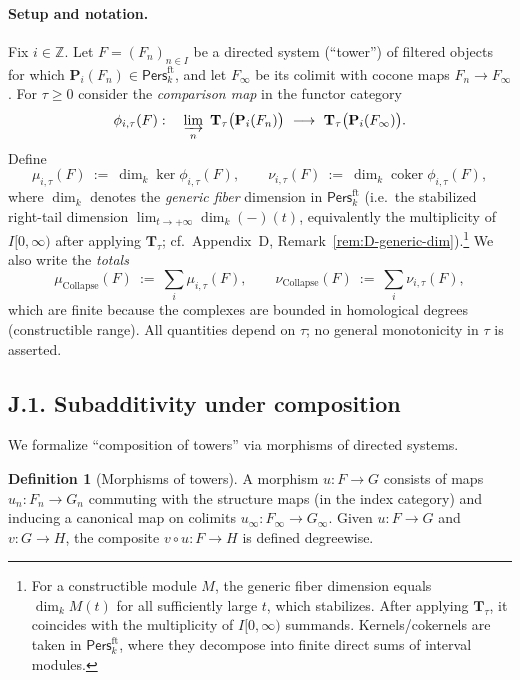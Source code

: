\documentclass[11pt]{article}
\numberwithin{equation}{section}
\theoremstyle{plain}
\theoremstyle{definition}
\theoremstyle{remark}
\newcommand{\Pers}{\mathsf{Pers}}
\theoremstyle{plain}
\theoremstyle{definition}
\numberwithin{equation}{section}
\theoremstyle{definition}
\newtheorem{definition}[theorem]{Definition}
\DeclareRobustCommand{\muc}{\mu_{\mathrm{Collapse}}}
\DeclareRobustCommand{\nuc}{\nu_{\mathrm{Collapse}}}
\numberwithin{equation}{section}
\theoremstyle{plain}
\theoremstyle{definition}
\theoremstyle{remark}
\providecommand{\muc}{\mu_{\mathrm{Collapse}}}
\providecommand{\nuc}{\nu_{\mathrm{Collapse}}}
\begin{document}
\paragraph{Setup and notation.}
Fix \(i\in\mathbb{Z}\).
Let \(F=(F_n)_{n\in I}\) be a directed system (``tower'') of filtered objects for which \(\mathbf{P}_i(F_n)\in\Pers^{\mathrm{ft}}_k\), and let \(F_\infty\) be its colimit with cocone maps \(F_n\to F_\infty\).
For \(\tau\ge 0\) consider the \emph{comparison map} in the functor category
\begin{equation}\label{J:eq:phi}
\phi_{i,\tau}(F):\quad
\varinjlim_{n}\ \mathbf{T}_\tau\big(\mathbf{P}_i(F_n)\big)\ \longrightarrow\ \mathbf{T}_\tau\big(\mathbf{P}_i(F_\infty)\big).
\end{equation}
Define
\begin{equation}\label{J:eq:mu-nu}
\mu_{i,\tau}(F)\ :=\ \dim_k \ker \phi_{i,\tau}(F),\qquad
\nu_{i,\tau}(F)\ :=\ \dim_k \operatorname{coker} \phi_{i,\tau}(F),
\end{equation}
where \(\dim_k\) denotes the \emph{generic fiber} dimension in \(\Pers^{\mathrm{ft}}_k\) (i.e.\ the stabilized right-tail dimension \(\lim_{t\to+\infty}\dim_k(-)(t)\), equivalently the multiplicity of \(I[0,\infty)\) after applying \(\mathbf{T}_\tau\); cf.\ Appendix~D, Remark~\ref{rem:D-generic-dim}).\footnote{For a constructible module \(M\), the generic fiber dimension equals \(\dim_k M(t)\) for all sufficiently large \(t\), which stabilizes. After applying \(\mathbf{T}_\tau\), it coincides with the multiplicity of \(I[0,\infty)\) summands. Kernels/cokernels are taken in \(\Pers^{\mathrm{ft}}_k\), where they decompose into finite direct sums of interval modules.}
We also write the \emph{totals}
\begin{equation}\label{J:eq:totals}
\muc(F)\ :=\ \sum_{i}\mu_{i,\tau}(F),\qquad
\nuc(F)\ :=\ \sum_{i}\nu_{i,\tau}(F),
\end{equation}
which are finite because the complexes are bounded in homological degrees (constructible range).
All quantities depend on \(\tau\); no general monotonicity in \(\tau\) is asserted.

\subsection*{J.1. Subadditivity under composition}
We formalize ``composition of towers'' via morphisms of directed systems.

\begin{definition}[Morphisms of towers]
A morphism \(u:F\to G\) consists of maps \(u_n:F_n\to G_n\) commuting with the structure maps (in the index category) and inducing a canonical map on colimits \(u_\infty:F_\infty\to G_\infty\).
Given \(u:F\to G\) and \(v:G\to H\), the composite \(v\circ u:F\to H\) is defined degreewise.
\end{definition}
\end{document}
